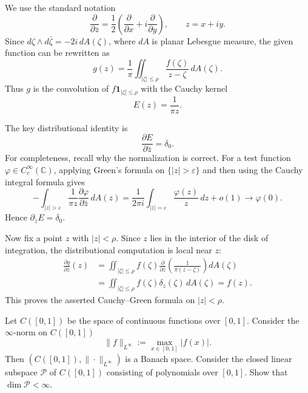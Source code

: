\begin{solution}
We use the standard notation
\[
\frac{\partial}{\partial\bar z}
=\frac12\left(\frac{\partial}{\partial x}+i\frac{\partial}{\partial y}\right),
\qquad z=x+iy.
\]
Since $d\zeta\wedge d\bar{\zeta}=-2i\,dA(\zeta)$, where $dA$ is planar Lebesgue measure, the given function can be rewritten as
\[
g(z)=\frac{1}{\pi}\iint_{|\zeta|\leq \rho}
\frac{f(\zeta)}{z-\zeta}\,dA(\zeta).
\]
Thus $g$ is the convolution of $f\mathbf{1}_{|\zeta|\leq\rho}$ with the Cauchy kernel
\[
E(z)=\frac{1}{\pi z}.
\]

The key distributional identity is
\[
\frac{\partial E}{\partial\bar z}=\delta_0.
\]
For completeness, recall why the normalization is correct.  For a test function $\varphi\in C_c^\infty(\mathbb{C})$, applying Green's formula on $\{|z|>\varepsilon\}$ and then using the Cauchy integral formula gives
\[
-\int_{|z|>\varepsilon}\frac{1}{\pi z}
\frac{\partial\varphi}{\partial\bar z}\,dA(z)
=\frac{1}{2\pi i}\int_{|z|=\varepsilon}\frac{\varphi(z)}{z}\,dz+o(1)
\longrightarrow \varphi(0).
\]
Hence $\partial_{\bar z}E=\delta_0$.

Now fix a point $z$ with $|z|<\rho$.  Since $z$ lies in the interior of the disk of integration, the distributional computation is local near $z$:
\[
\begin{aligned}
\frac{\partial g}{\partial\bar z}(z)
&=\iint_{|\zeta|\leq\rho}
f(\zeta)\frac{\partial}{\partial\bar z}
\left(\frac{1}{\pi(z-\zeta)}\right)dA(\zeta) \\
&=\iint_{|\zeta|\leq\rho}f(\zeta)\delta_z(\zeta)\,dA(\zeta)
=f(z).
\end{aligned}
\]
This proves the asserted Cauchy--Green formula on $|z|<\rho$.
\end{solution}

\begin{exercise}
\label{analysis:2026:4}
Let $C([0,1])$ be the space of continuous functions over $[0,1]$.  Consider the $\infty$-norm on $C([0,1])$
\[
\|f\|_{L^\infty}:=\max_{x\in[0,1]}|f(x)|.
\]
Then $(C([0,1]),\|\cdot\|_{L^\infty})$ is a Banach space.  Consider the closed linear subspace $\mathcal{P}$ of $C([0,1])$ consisting of polynomials over $[0,1]$.  Show that $\dim\mathcal{P}<\infty$.
\end{exercise}

